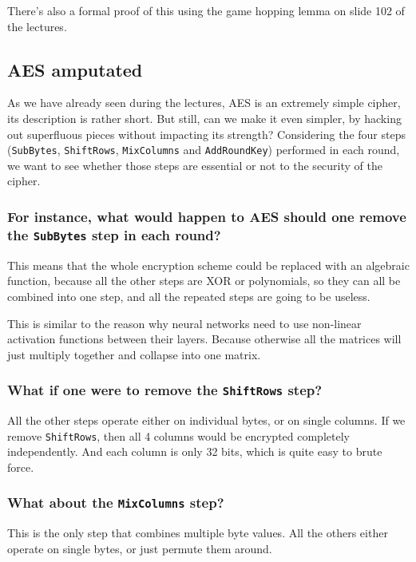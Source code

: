 \documentclass{article}
\begin{document}
  There's also a formal proof of this using the game hopping lemma on slide 102 of the lectures.

  \subsection{AES amputated}
  \begin{centerframebox}
    As we have already seen during the lectures, AES is an extremely simple
    cipher, its description is rather short. But still, can we make it even simpler,
    by hacking out superfluous pieces without impacting its strength?
    Considering the four steps (\texttt{SubBytes}, \texttt{ShiftRows}, \texttt{MixColumns} and
    \texttt{AddRoundKey}) performed in each round, we want to see whether those
    steps are essential or not to the security of the cipher.
  \end{centerframebox}
  \subsubsection{For instance, what would happen to AES should one remove the \texttt{SubBytes} step in each round?}
  This means that the whole encryption scheme could be replaced with an algebraic function, because all the other steps are XOR or polynomials, so they can all be combined into one step, and all the repeated steps are going to be useless.

  This is similar to the reason why neural networks need to use non-linear activation functions between their layers.
  Because otherwise all the matrices will just multiply together and collapse into one matrix.

  \subsubsection{What if one were to remove the \texttt{ShiftRows} step?}
  All the other steps operate either on individual bytes, or on single columns.
  If we remove \texttt{ShiftRows}, then all 4 columns would be encrypted completely independently.
  And each column is only 32 bits, which is quite easy to brute force.

  \subsubsection{What about the \texttt{MixColumns} step?}
  This is the only step that combines multiple byte values.
  All the others either operate on single bytes, or just permute them around.
\end{document}

